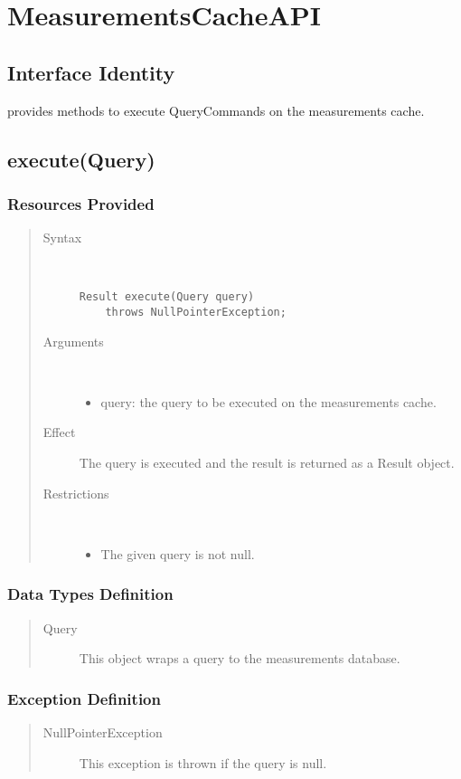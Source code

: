 \section{MeasurementsCacheAPI}

\subsection{Interface Identity}

\npar {} provides methods to execute
QueryCommands on the measurements cache.

\subsection{execute(Query)}

\subsubsection{Resources Provided}

\begin{quote}
	\begin{description}
		\item[Syntax] \ 
		\begin{verbatim}
Result execute(Query query) 
    throws NullPointerException;
		\end{verbatim}
		\item[Arguments] \
		\begin{itemize}
			\item query: the query to be executed on the measurements cache. 
		\end{itemize}
		\item[Effect] The query is executed and the result is returned as a Result
		object.
		\item[Restrictions] \ 
		\begin{itemize}
			\item The given query is not null.
		\end{itemize}
	\end{description} 
\end{quote}

\subsubsection{Data Types Definition}

\begin{quote}
	\begin{description}
		\item[Query] This object wraps a query to the measurements database.
	\end{description} 
\end{quote}

\subsubsection{Exception Definition}

\begin{quote}
	\begin{description}
		\item[NullPointerException] This exception is thrown if the query is null.
	\end{description} 
\end{quote}